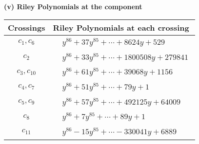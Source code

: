 \documentclass[1p]{elsarticle_modified}
\theoremstyle{definition}
\begin{document}
\flushleft \textbf{(v) Riley Polynomials at the component}\newline \\
\begin{tabular}{m{50pt}|m{274pt}}
Crossings & \hspace{64pt}Riley Polynomials at each crossing \\
\hline $$\begin{aligned}c_{1},c_{6}\end{aligned}$$&$\begin{aligned}
&y^{86}+37 y^{85}+\cdots+8624 y+529
\end{aligned}$\\
\hline $$\begin{aligned}c_{2}\end{aligned}$$&$\begin{aligned}
&y^{86}+33 y^{85}+\cdots+1800508 y+279841
\end{aligned}$\\
\hline $$\begin{aligned}c_{3},c_{10}\end{aligned}$$&$\begin{aligned}
&y^{86}+61 y^{85}+\cdots+39068 y+1156
\end{aligned}$\\
\hline $$\begin{aligned}c_{4},c_{7}\end{aligned}$$&$\begin{aligned}
&y^{86}+51 y^{85}+\cdots+79 y+1
\end{aligned}$\\
\hline $$\begin{aligned}c_{5},c_{9}\end{aligned}$$&$\begin{aligned}
&y^{86}+57 y^{85}+\cdots+492125 y+64009
\end{aligned}$\\
\hline $$\begin{aligned}c_{8}\end{aligned}$$&$\begin{aligned}
&y^{86}+7 y^{85}+\cdots+89 y+1
\end{aligned}$\\
\hline $$\begin{aligned}c_{11}\end{aligned}$$&$\begin{aligned}
&y^{86}-15 y^{85}+\cdots-330041 y+6889
\end{aligned}$\\
\hline
\end{tabular}\\~\\
\end{document}
